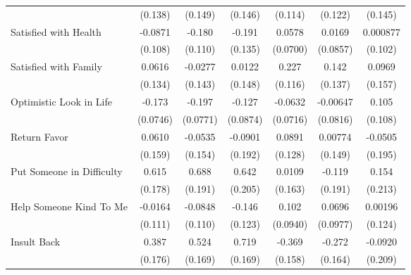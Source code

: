 {\begin{tabular}{l*{6}{c}}
            &     (0.138)         &     (0.149)         &     (0.146)         &     (0.114)         &     (0.122)         &     (0.145)         \\
\addlinespace
Satisfied with Health&     -0.0871         &      -0.180         &      -0.191         &      0.0578         &      0.0169         &    0.000877         \\
            &     (0.108)         &     (0.110)         &     (0.135)         &    (0.0700)         &    (0.0857)         &     (0.102)         \\
\addlinespace
Satisfied with Family&      0.0616         &     -0.0277         &      0.0122         &       0.227\sym{*}  &       0.142         &      0.0969         \\
            &     (0.134)         &     (0.143)         &     (0.148)         &     (0.116)         &     (0.137)         &     (0.157)         \\
\addlinespace
Optimistic Look in Life&      -0.173\sym{*}  &      -0.197\sym{*}  &      -0.127         &     -0.0632         &    -0.00647         &       0.105         \\
            &    (0.0746)         &    (0.0771)         &    (0.0874)         &    (0.0716)         &    (0.0816)         &     (0.108)         \\
\addlinespace
Return Favor&      0.0610         &     -0.0535         &     -0.0901         &      0.0891         &     0.00774         &     -0.0505         \\
            &     (0.159)         &     (0.154)         &     (0.192)         &     (0.128)         &     (0.149)         &     (0.195)         \\
\addlinespace
Put Someone in Difficulty&       0.615\sym{***}&       0.688\sym{***}&       0.642\sym{**} &      0.0109         &      -0.119         &       0.154         \\
            &     (0.178)         &     (0.191)         &     (0.205)         &     (0.163)         &     (0.191)         &     (0.213)         \\
\addlinespace
Help Someone Kind To Me&     -0.0164         &     -0.0848         &      -0.146         &       0.102         &      0.0696         &     0.00196         \\
            &     (0.111)         &     (0.110)         &     (0.123)         &    (0.0940)         &    (0.0977)         &     (0.124)         \\
\addlinespace
Insult Back &       0.387\sym{*}  &       0.524\sym{**} &       0.719\sym{***}&      -0.369\sym{*}  &      -0.272         &     -0.0920         \\
            &     (0.176)         &     (0.169)         &     (0.169)         &     (0.158)         &     (0.164)         &     (0.209)         \\
\bottomrule
\end{tabular}
}
